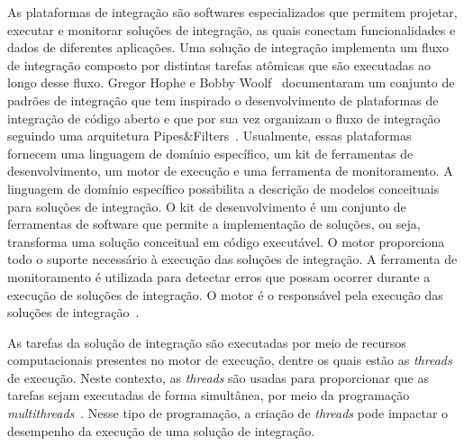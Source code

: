 As plataformas de integração são softwares especializados que permitem projetar, executar e monitorar soluções de integração, as quais conectam funcionalidades e dados de diferentes aplicações. Uma solução de integração implementa um fluxo de integração composto por distintas tarefas atômicas que são executadas ao longo desse fluxo. Gregor Hophe e Bobby Woolf~\cite{hohpe2004} documentaram um conjunto de padrões de integração que tem inspirado o desenvolvimento de plataformas de integração de código aberto e que por sua vez organizam o fluxo de integração seguindo uma arquitetura Pipes\&Filters~\cite{alexander1977}. 
 Usualmente, essas plataformas fornecem uma linguagem de domínio específico, um kit de ferramentas de desenvolvimento, um motor de execução e uma ferramenta de monitoramento. A linguagem de domínio específico possibilita a descrição de modelos conceituais para soluções de integração. O kit de desenvolvimento é um conjunto de ferramentas de software que permite a implementação de soluções, ou seja, transforma uma solução conceitual em código executável. O motor proporciona todo o suporte necessário à execução das soluções de integração. A ferramenta de monitoramento é utilizada para detectar erros que possam ocorrer durante a execução de soluções de integração. O motor é o responsável pela execução das soluções de integração~\cite{frantz2016}. 

As tarefas da solução de integração são executadas por meio de recursos computacionais presentes no motor de execução, dentre os quais estão as \emph{threads} de execução. Neste contexto, as \emph{threads} s\~{a}o usadas para proporcionar que as tarefas sejam executadas de forma simultânea, por meio da programação \emph{multithreads}~\cite{dietel2009,tanebaum2009}. Nesse tipo de programação, a criação de \emph{threads} pode impactar o desempenho da execução de uma solução de integração.

